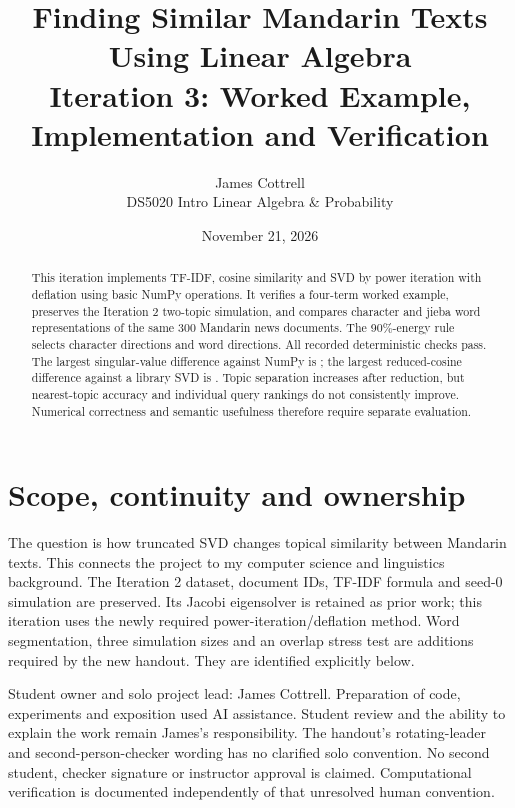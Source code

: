\documentclass[11pt]{article}
\title{Finding Similar Mandarin Texts\\Using Linear Algebra\\[6pt]
\large Iteration 3: Worked Example, Implementation and Verification}
\author{James Cottrell\\DS5020 Intro Linear Algebra \& Probability}
\date{November 21, 2026}
\begin{document}
\maketitle
\begin{abstract}
This iteration implements TF-IDF, cosine similarity and SVD by power iteration
with deflation using basic NumPy operations. It verifies a four-term worked
example, preserves the Iteration 2 two-topic simulation, and compares character
and jieba word representations of the same 300 Mandarin news documents.
The 90\%-energy rule selects \CharRank{} character directions and \WordRank{}
word directions. All \VerificationCount{} recorded deterministic checks pass.
The largest singular-value difference against NumPy is \MaxSigmaError{};
the largest reduced-cosine difference against a library SVD is \MaxCosineError.
Topic separation increases after reduction, but nearest-topic accuracy and
individual query rankings do not consistently improve. Numerical correctness
and semantic usefulness therefore require separate evaluation.
\end{abstract}

\section{Scope, continuity and ownership}
The question is how truncated SVD changes topical similarity between Mandarin
texts. This connects the project to my computer science and linguistics background.
The Iteration 2 dataset, document IDs, TF-IDF formula and seed-0 simulation are
preserved. Its Jacobi eigensolver is retained as prior work; this iteration uses
the newly required power-iteration/deflation method. Word segmentation, three
simulation sizes and an overlap stress test are additions required by the new
handout. They are identified explicitly below.

Student owner and solo project lead: James Cottrell. Preparation of code,
experiments and exposition used AI assistance. Student review and the ability
to explain the work remain James's responsibility. The handout's rotating-leader
and second-person-checker wording has no clarified solo convention. No second
student, checker signature or instructor approval is claimed. Computational
verification is documented independently of that unresolved human convention.
\end{document}
